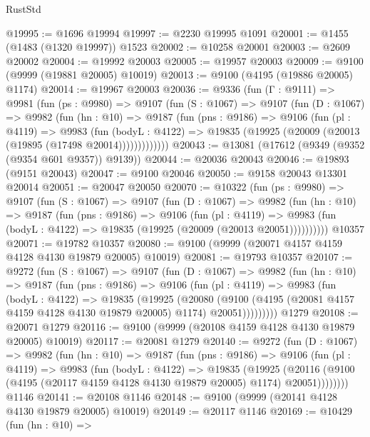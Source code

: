 \begin{lexlean}{RustStd}
\begin{coremodule}
@19995 := @1696 @19994
@19997 := @2230 @19995 @1091
@20001 := @1455 (@1483 (@1320 @19997)) @1523
@20002 := @10258 @20001
@20003 := @2609 @20002
@20004 := @19992 @20003
@20005 := @19957 @20003
@20009 := @9100 (@9999 (@19881 @20005) @10019)
@20013 := @9100 (@4195 (@19886 @20005) @1174)
@20014 := @19967 @20003
@20036 := @9336
    (fun (Γ : @9111) =>
    @9981
      (fun (ps : @9980) =>
      @9107
        (fun (S : @1067) =>
        @9107
          (fun (D : @1067) =>
          @9982
            (fun (hn : @10) =>
            @9187
              (fun (pns : @9186) =>
              @9106
                (fun (pl : @4119) =>
                @9983
                  (fun (bodyL : @4122) =>
                  @19835 (@19925 (@20009 (@20013 (@19895 (@17498 @20014)))))))))))))
@20043 := @13081 (@17612 (@9349 (@9352 (@9354 @601 @9357)) @9139))
@20044 := @20036 @20043
@20046 := @19893 (@9151 @20043)
@20047 := @9100 @20046
@20050 := @9158 @20043 @13301 @20014
@20051 := @20047 @20050
@20070 := @10322
    (fun (ps : @9980) =>
    @9107
      (fun (S : @1067) =>
      @9107
        (fun (D : @1067) =>
        @9982
          (fun (hn : @10) =>
          @9187
            (fun (pns : @9186) =>
            @9106
              (fun (pl : @4119) =>
              @9983 (fun (bodyL : @4122) => @19835 (@19925 (@20009 (@20013 @20051))))))))))
    @10357
@20071 := @19782 @10357
@20080 := @9100 (@9999 (@20071 @4157 @4159 @4128 @4130 @19879 @20005) @10019)
@20081 := @19793 @10357
@20107 := @9272
    (fun (S : @1067) =>
    @9107
      (fun (D : @1067) =>
      @9982
        (fun (hn : @10) =>
        @9187
          (fun (pns : @9186) =>
          @9106
            (fun (pl : @4119) =>
            @9983
              (fun (bodyL : @4122) =>
              @19835
                (@19925
                  (@20080
                    (@9100
                      (@4195 (@20081 @4157 @4159 @4128 @4130 @19879 @20005) @1174)
                      @20051)))))))))
    @1279
@20108 := @20071 @1279
@20116 := @9100 (@9999 (@20108 @4159 @4128 @4130 @19879 @20005) @10019)
@20117 := @20081 @1279
@20140 := @9272
    (fun (D : @1067) =>
    @9982
      (fun (hn : @10) =>
      @9187
        (fun (pns : @9186) =>
        @9106
          (fun (pl : @4119) =>
          @9983
            (fun (bodyL : @4122) =>
            @19835
              (@19925
                (@20116 (@9100 (@4195 (@20117 @4159 @4128 @4130 @19879 @20005) @1174) @20051))))))))
    @1146
@20141 := @20108 @1146
@20148 := @9100 (@9999 (@20141 @4128 @4130 @19879 @20005) @10019)
@20149 := @20117 @1146
@20169 := @10429
    (fun (hn : @10) =>

\end{coremodule}
\end{lexlean}

